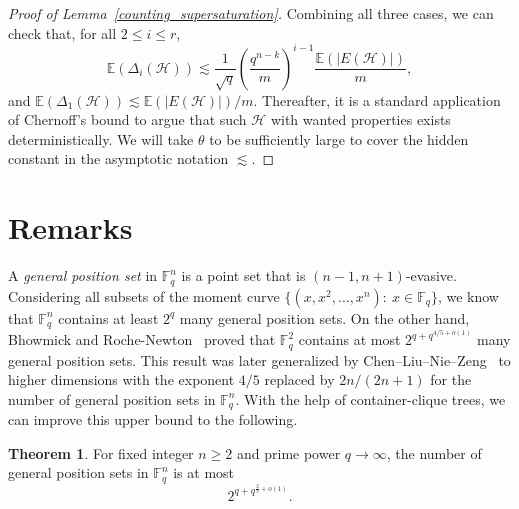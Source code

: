 \documentclass[11pt]{article}
\theoremstyle{definition}
\newtheorem{theorem}{Theorem}[section]
\begin{document}
\begin{proof}[Proof of Lemma~\ref{counting_supersaturation}]
    Combining all three cases, we can check that, for all $2\leq i\leq r$, \begin{equation*}
        \mathbb{E}(\Delta_i(\mathcal{H})) \lesssim \frac{1}{\sqrt{q}} \left(\frac{q^{n-k}}{m}\right)^{i-1}\frac{\mathbb{E}(|E(\mathcal{H})|)}{m}, 
    \end{equation*} and $\mathbb{E}(\Delta_1(\mathcal{H})) \lesssim \mathbb{E}(|E(\mathcal{H})|)/m$. Thereafter, it is a standard application of Chernoff's bound to argue that such $\mathcal{H}$ with wanted properties exists deterministically. We will take $\theta$ to be sufficiently large to cover the hidden constant in the asymptotic notation $\lesssim$.
\end{proof}

\section{Remarks}\label{sec:remark}

A \textit{general position set} in $\mathbb{F}_q^n$ is a point set that is $(n-1,n+1)$-evasive. Considering all subsets of the moment curve $\{(x,x^2,\dots,x^n):~ x\in \mathbb{F}_q\}$, we know that $\mathbb{F}^n_q$ contains at least $2^q$ many general position sets. On the other hand, Bhowmick and Roche-Newton~\cite{bhowmick2022counting} proved that $\mathbb{F}^2_q$ contains at most $2^{q+q^{4/5+o(1)}}$ many general position sets. This result was later generalized by Chen--Liu--Nie--Zeng~\cite{chen2023random} to higher dimensions with the exponent $4/5$ replaced by $2n/(2n+1)$ for the number of general position sets in $\mathbb{F}^n_q$. With the help of container-clique trees, we can improve this upper bound to the following.
\begin{theorem}\label{general_position}
For fixed integer $n\ge 2$ and prime power $q\to\infty$, the number of general position sets in $\mathbb{F}^n_q$ is at most \begin{equation*}
    2^{q+q^{\frac{2}{3}+o(1)}}.
\end{equation*}
\end{theorem}
\end{document}

